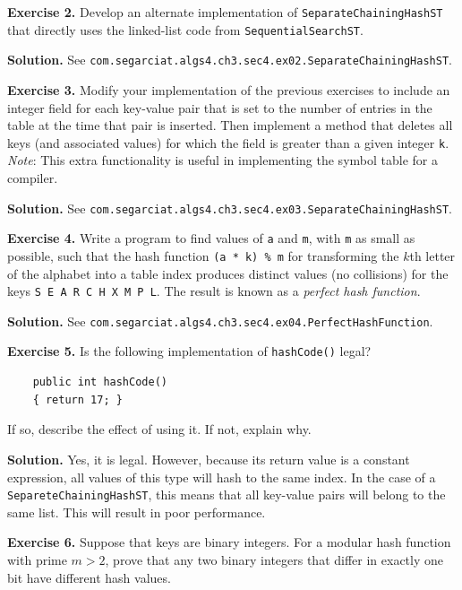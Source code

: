 \documentclass[12pt, a4paper]{article}
\newenvironment{ex}[2][Exercise]
{\par\medskip\noindent \textbf{#1 #2.}}
{\medskip}
\newenvironment{sol}[1][Solution]
{\par\medskip\noindent \textbf{#1.} }
{\medskip}
\begin{document}
	\begin{ex}{2}
		Develop an alternate implementation of \texttt{SeparateChainingHashST} that directly
		uses the linked-list code from \texttt{SequentialSearchST}.
	\end{ex}
	\begin{sol}
		See \texttt{com.segarciat.algs4.ch3.sec4.ex02.SeparateChainingHashST}.
	\end{sol}
	\begin{ex}{3}
		Modify your implementation of the previous exercises to include an integer field for
		each key-value pair that is set to the number of entries in the table at the time
		that pair is inserted. Then implement a method that deletes all keys (and associated
		values) for which the field is greater than a given integer \texttt{k}.
		\emph{Note}: This extra functionality is useful in implementing the symbol table for
		a compiler.
	\end{ex}
	\begin{sol}
		See \texttt{com.segarciat.algs4.ch3.sec4.ex03.SeparateChainingHashST}.
	\end{sol}
	\begin{ex}{4}
		Write a program to find values of \texttt{a} and \texttt{m}, with \texttt{m} as small
		as possible, such that the hash function \texttt{(a * k) \% m} for transforming the
		$k$th letter of the alphabet into a table index produces distinct values (no collisions)
		for the keys \texttt{S E A R C H X M P L}. The result is known as a \emph{perfect hash function}.
	\end{ex}
	\begin{sol}
		See \texttt{com.segarciat.algs4.ch3.sec4.ex04.PerfectHashFunction}.
	\end{sol}
	\begin{ex}{5}
		Is the following implementation of \texttt{hashCode()} legal?
		\begin{lstlisting}
	public int hashCode()
	{ return 17; }
		\end{lstlisting}
		If so, describe the effect of using it. If not, explain why.
	\end{ex}
	\begin{sol}
		Yes, it is legal. However, because its return value is a constant expression, all
		values of this type will hash to the same index. In the case of a \texttt{SepareteChainingHashST},
		this means that all key-value pairs will belong to the same list. This will result
		in poor performance.
	\end{sol}
	\begin{ex}{6}
		Suppose that keys are binary integers. For a modular hash function with prime $m > 2$,
		prove that any two binary integers that differ in exactly one bit have different hash values.
	\end{ex}
\end{document}
